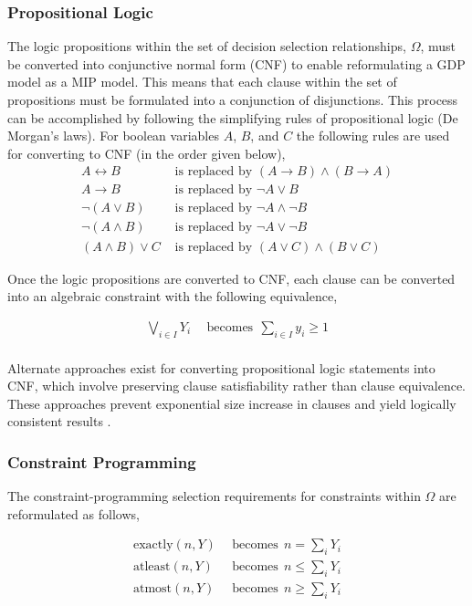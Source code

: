 \documentclass{juliacon}
\begin{document}
\subsubsection{Propositional Logic}
The logic propositions within the set of decision selection relationships, $\Omega$, must be converted into conjunctive normal form (CNF) to enable reformulating a GDP model as a MIP model. This means that each clause within the set of propositions must be formulated into a conjunction of disjunctions. This process can be accomplished by following the simplifying rules of propositional logic (De Morgan's laws). For boolean variables $A$, $B$, and $C$ the following rules are used for converting to CNF (in the order given below),
\begin{align*}
    A \leftrightarrow B & \text{ is replaced by } (A \rightarrow B) \land (B \rightarrow A) \\
    A \rightarrow B & \text{ is replaced by } \lnot A \lor B \\
    \lnot(A \lor B) & \text{ is replaced by } \lnot A \land \lnot B \\
    \lnot(A \land B) & \text{ is replaced by } \lnot A \lor \lnot B \\
    (A \land B) \lor C & \text{ is replaced by } (A \lor C) \land (B \lor C)
\end{align*}

Once the logic propositions are converted to CNF, each clause can be converted into an algebraic constraint with the following equivalence,

\begin{align*}
    \bigvee_{i \in I} Y_i & \ \ \text{becomes} \ \ \sum_{i\in I} y_i \geq 1 \\
\end{align*}

Alternate approaches exist for converting propositional logic statements into CNF, which involve preserving clause satisfiability rather than clause equivalence. These approaches prevent exponential size increase in clauses and yield logically consistent results \cite{jackson_sheridan_2005}.

\subsubsection{Constraint Programming}
The constraint-programming selection requirements for constraints within $\Omega$ are reformulated as follows,

\begin{align*}
    \text{exactly}(n, Y) & \ \ \text{becomes} \ \ n = \sum_i Y_i \\
    \text{atleast}(n, Y) &  \ \ \text{becomes} \ \ n \leq \sum_i Y_i \\
    \text{atmost}(n, Y) &  \ \ \text{becomes} \ \ n \geq \sum_i Y_i
\end{align*}
\end{document}

